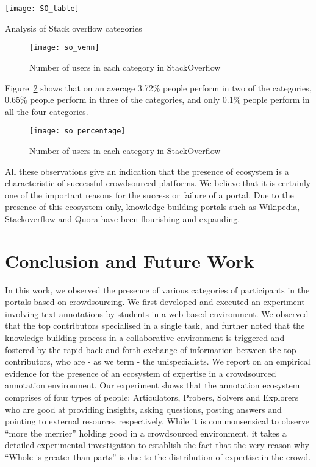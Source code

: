 \documentclass{llncs}
\begin{document}
\begin{table}[htbp]
\centering
\texttt{[image: SO\_table]}
\caption{Analysis of Stack overflow categories}
\label{fig:SO_table}
\end{table}

\begin{figure}[htbp]
\centering
\texttt{[image: so\_venn]}
\caption{Number of users in each category in StackOverflow}
\label{fig:so_venn}
\end{figure}
Figure~\ref{fig:so_percentage} shows that on an average 3.72\% people perform in two of the categories, 0.65\% people perform in three of the categories, and only 0.1\% people perform in all the four categories.

\begin{figure}[ht!]
\centering
\texttt{[image: so\_percentage]}
\caption{Number of users in each category in StackOverflow}
\label{fig:so_percentage}
\end{figure}
All these observations give an indication that the presence of ecosystem is a characteristic of successful crowdsourced platforms. We believe that it is certainly one of the important reasons for the success or failure of a portal. Due to the presence of this ecosystem only, knowledge building portals such as Wikipedia, Stackoverflow and Quora have been flourishing and expanding.
\section{Conclusion and Future Work}
In this work, we observed the presence of various categories of participants in the portals based on crowdsourcing. We first developed and executed an experiment involving text annotations by students in a web based environment. We observed that the top contributors specialised in a single task, and further noted that the knowledge building process in a collaborative environment is triggered and fostered by the rapid back and forth exchange of information between the top contributors, who are - as we term - the unispecialists. We report on an empirical evidence for the presence of an ecosystem of expertise in a crowdsourced annotation environment. Our experiment shows that the annotation ecosystem comprises of four types of people: Articulators, Probers, Solvers and Explorers who are good at providing insights, asking questions, posting answers and pointing to external resources respectively. While it is commonsensical to observe ``more the merrier'' holding good in a crowdsourced environment, it takes a detailed experimental investigation to establish the fact that the very reason why ``Whole is greater than parts'' is due to the distribution of expertise in the crowd.\\
\end{document}
